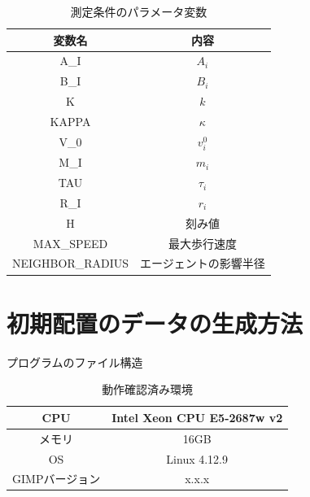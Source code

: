 \begin{table}[t]
  \begin{center}
    \caption{測定条件のパラメータ変数}
    \label{tb:parameter_settings}
    \begin{tabular}{c|c}
      \hline \hline
      変数名 & 内容 \\ \hline
      A\_I & $A_i$ \\ \hline
      B\_I & $B_i$ \\ \hline 
      K   & $k$   \\ \hline 
      KAPPA & $\kappa$  \\ \hline 
      V\_0 & $v_i^0$     \\ \hline 
      M\_I & $m_i$       \\ \hline 
      TAU & $\tau_i$    \\ \hline 
      R\_I & $r_i$       \\ \hline 
      H   & 刻み値 \\ \hline
      MAX\_SPEED & 最大歩行速度 \\ \hline
      NEIGHBOR\_RADIUS & エージェントの影響半径 \\ \hline

    \end{tabular}
  \end{center}
\end{table}

\section{初期配置のデータの生成方法}

\begin{itembox}[l]{プログラムのファイル構造}
\end{itembox}

\begin{table}[H]
  \begin{center}
    \caption{動作確認済み環境}
    \label{tb:conform_env}
    \begin{tabular}{c|c}
      \hline \hline
      CPU              & Intel Xeon CPU E5-2687w v2 \\ \hline
      メモリ           & 16GB                       \\ \hline
      OS               & Linux 4.12.9               \\ \hline
      GIMPバージョン & x.x.x \\ \hline
    \end{tabular}
  \end{center}
\end{table}



